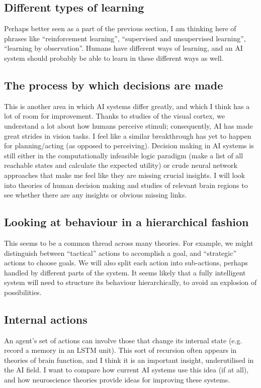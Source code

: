 \documentclass[10pt,a4paper]{article}
\newcommand{\nquote}[1]{``{#1}''}
\begin{document}
\subsection{Different types of learning}
Perhaps better seen as a part of the previous section, I am thinking here of phrases like \nquote{reinforcement learning}, \nquote{supervised and unsupervised learning}, \nquote{learning by observation}. Humans have different ways of learning, and an AI system should probably be able to learn in these different ways as well.

\subsection{The process by which decisions are made}
This is another area in which AI systems differ greatly, and which I think has a lot of room for improvement. Thanks to studies of the visual cortex, we understand a lot about how humans perceive stimuli; consequently, AI has made great strides in vision tasks. I feel like a similar breakthrough has yet to happen for planning/acting (as opposed to perceiving). Decision making in AI systems is still either in the computationally infeasible logic paradigm (make a list of all reachable states and calculate the expected utility) or crude neural network approaches that make me feel like they are missing crucial insights. I will look into theories of human decision making and studies of relevant brain regions to see whether there are any insights or obvious missing links.

\subsection{Looking at behaviour in a hierarchical fashion}
This seems to be a common thread across many theories. For example, we might distinguish between \nquote{tactical} actions to accomplish a goal, and \nquote{strategic} actions to choose goals. We will also split each action into sub-actions, perhaps handled by different parts of the system. It seems likely that a fully intelligent system will need to structure its behaviour hierarchically, to avoid an explosion of possibilities.

\subsection{Internal actions}
An agent's set of actions can involve those that change its internal state (e.g. record a memory in an LSTM unit). This sort of recursion often appears in theories of brain function, and I think it is an important insight, underutilised in the AI field. I want to compare how current AI systems use this idea (if at all), and how neuroscience theories provide ideas for improving these systems.
\end{document}
